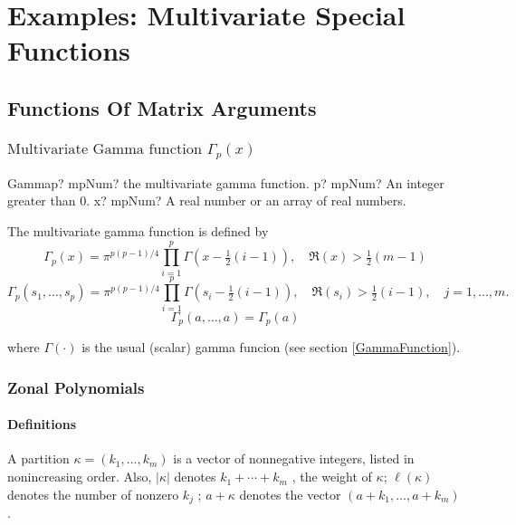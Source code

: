 \chapter{Examples: Multivariate Special Functions}


\section{Functions Of Matrix Arguments}
\label{FunctionsOfMatrixArguments}



\subsection{\texorpdfstring{$\text{Multivariate Gamma function }\Gamma_p(x)$}{Multivariate Gamma}}
\label{MultivariateGammaFunction} 


\begin{mpFunctionsExtract}
	\mpFunctionTwoNotImplemented
	{Gammap? mpNum? the multivariate gamma function.}
	{p? mpNum? An integer greater than 0.}
	{x? mpNum? A real number or an array of real numbers.}	
\end{mpFunctionsExtract}


\vspace{0.3cm}
The multivariate gamma function is defined by
\begin{equation}
	\Gamma_p(x)  = \pi^{p(p-1)/4} \prod_{i=1}^p \Gamma\left(x-\tfrac{1}{2}(i-1)\right), \quad \Re(x) > \tfrac{1}{2}(m-1)
\end{equation}
\begin{equation}
	\Gamma_p(s_1,\ldots,s_p)  = \pi^{p(p-1)/4} \prod_{i=1}^p \Gamma\left(s_i-\tfrac{1}{2}(i-1)\right), \quad \Re(s_i) > \tfrac{1}{2}(i-1), \quad j=1,\ldots,m.
\end{equation}
\begin{equation}
	\Gamma_p(a,\ldots,a)  = \Gamma_p(a)
\end{equation}

where $\Gamma(\cdot)$ is the usual (scalar) gamma funcion (see section \ref{GammaFunction}).





\newpage
\subsection{Zonal Polynomials}
\label{ZonalPolynomials}

\subsubsection{Definitions}
A partition $\kappa = (k_1 , . . . , k_m)$ is a vector of nonnegative integers, listed in nonincreasing order. Also, $|\kappa|$ denotes $k_1 + \cdots +k_m$ , the weight of $\kappa$; $\ell(\kappa)$ denotes the number of nonzero $k_j$ ; $a+\kappa$ denotes the vector $(a+k_1,\ldots, a+k_m )$.


